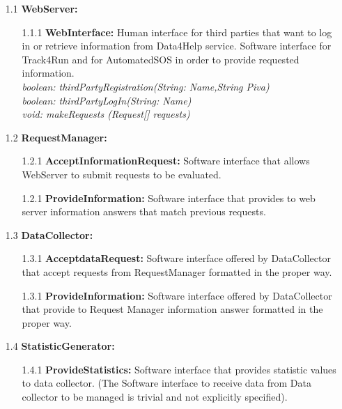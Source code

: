 \begin{enumerate}

\item[1.1] \textbf{WebServer: }
	\begin{enumerate}
		\item[1.1.1] \textbf{WebInterface:} Human interface for third parties that want to log in or retrieve information from Data4Help service. Software interface for Track4Run and for AutomatedSOS in order to provide requested information.
		\\\textit{ boolean: thirdPartyRegistration(String: Name,String Piva)
				\\ boolean: thirdPartyLogIn(String: Name)
				\\ void: makeRequests (Request[] requests)
				 }
	\end{enumerate}
	
\item[1.2] \textbf{RequestManager: }
	\begin{enumerate}
		\item[1.2.1] \textbf{AcceptInformationRequest:} Software interface that allows WebServer to submit requests to be evaluated.
		\item[1.2.1] \textbf{ProvideInformation:} Software interface that provides to web server information answers that match previous requests.
	\end{enumerate}

\item[1.3] \textbf{DataCollector: }
	\begin{enumerate}
		\item[1.3.1] \textbf{AcceptdataRequest:} Software interface offered by DataCollector that accept requests from RequestManager formatted in the proper way.
		\item[1.3.1] \textbf{ProvideInformation:} Software interface offered by DataCollector that provide to Request Manager information answer formatted in the proper way.
	\end{enumerate}
	
\item[1.4] \textbf{StatisticGenerator: }
	\begin{enumerate}
		\item[1.4.1] \textbf{ProvideStatistics:} Software interface that provides statistic values to data collector. (The Software interface to receive data from Data collector to be managed is trivial and not explicitly specified).
	\end{enumerate}
	

\end{enumerate}
